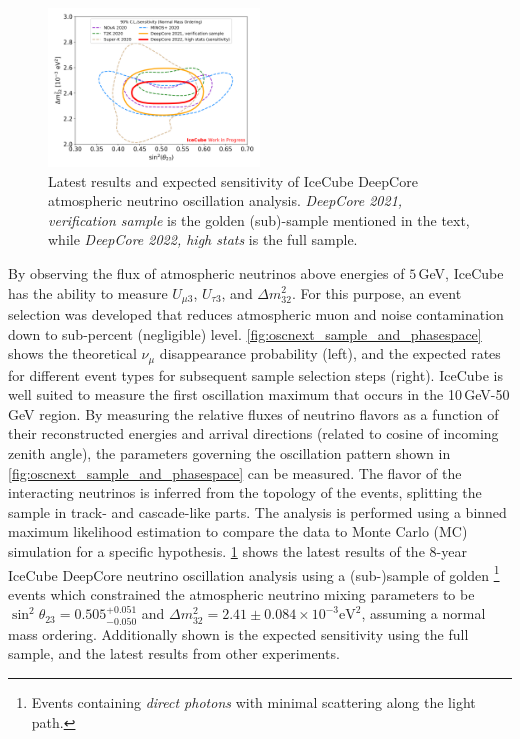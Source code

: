 \documentclass[a4paper,11pt]{article}
\begin{document}
\begin{figure}
  \includegraphics[width=0.5\textwidth]{figures/OscNext_numu_disappearance_sensitivity_public_v2.png}
  \caption{Latest results and expected sensitivity of IceCube DeepCore atmospheric neutrino oscillation analysis. \textit{DeepCore 2021, verification sample} is the golden (sub)-sample mentioned in the text, while \textit{DeepCore 2022, high stats} is the full sample.}
  \label{fig:oscnext_oscillations_results}
\end{figure}
By observing the flux of atmospheric neutrinos above energies of $5\,$GeV, IceCube has the ability to measure $U_{\mu3}$, $U_{\tau3}$, and $\Delta m^{2}_{32}$. For this purpose, an event selection was developed that reduces atmospheric muon and noise contamination down to sub-percent (negligible) level. \cref{fig:oscnext_sample_and_phasespace} shows the theoretical $\nu_{\mu}$ disappearance probability (left), and the expected rates for different event types for subsequent sample selection steps (right). IceCube is well suited to measure the first oscillation maximum that occurs in the 10\,GeV-50\,GeV region. By measuring the relative fluxes of neutrino flavors as a function of their reconstructed energies and arrival directions (related to cosine of incoming zenith angle), the parameters governing the oscillation pattern shown in \cref{fig:oscnext_sample_and_phasespace} can be measured. The flavor of the interacting neutrinos is inferred from the topology of the events, splitting the sample in track- and cascade-like parts. The analysis is performed using a binned maximum likelihood estimation to compare the data to Monte Carlo (MC) simulation for a specific hypothesis. \cref{fig:oscnext_oscillations_results} shows the latest results of the 8-year IceCube DeepCore neutrino oscillation analysis using a (sub-)sample of golden \footnote{Events containing \textit{direct photons} with minimal scattering along the light path.} events which constrained the atmospheric neutrino mixing parameters to be $\sin^2\theta_{23} = 0.505^{+0.051}_{-0.050}$ and $\Delta m^2_{32} = 2.41\pm0.084 \times 10^{-3}\mathrm{eV}^2$, assuming a normal mass ordering. Additionally shown is the expected sensitivity using the full sample, and the latest results from other experiments.
\end{document}
